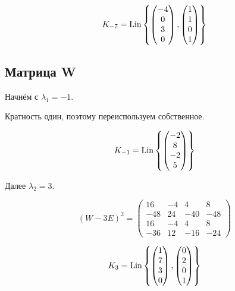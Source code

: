 \documentclass[12pt, a4paper]{article}
\begin{document}
    \begin{equation}
        K_{-7} = \operatorname{Lin} \left\{ \begin{pmatrix} -4\\0\\3\\0 \end{pmatrix}, \begin{pmatrix} 1\\1\\0\\1 \end{pmatrix} \right\}
    \end{equation}
    

    \subsection{Матрица W}

    Начнём с $\lambda_1 = -1$.

    Кратность один, поэтому переиспользуем собственное.

    \begin{equation}
        K_{-1} = \operatorname{Lin} \left\{\begin{pmatrix} -2\\8\\-2\\5 \end{pmatrix} \right\}
    \end{equation}
    

    Далее $\lambda_2 = 3$.


    \begin{equation}
        (W - 3E)^2 = \left(\begin{matrix}
            16 & -4 & 4 & 8 \\
            -48 & 24 & -40 & -48 \\
            16 & -4 & 4 & 8 \\
            -36 & 12 & -16 & -24
        \end{matrix}\right)
    \end{equation}

    \begin{equation}
        K_{3} = \operatorname{Lin} \left\{\begin{pmatrix} 1\\7\\3\\0 \end{pmatrix}, \begin{pmatrix} 0\\2\\0\\1 \end{pmatrix} \right\}
    \end{equation}
\end{document}
